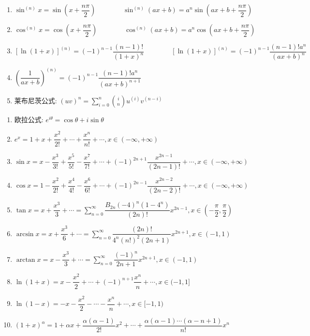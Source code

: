 \begin{theorem}[高阶导数]
	\begin{enumerate}
		\item $\sin^{(n)} x = \sin (x+\dfrac{n\pi}{2})\qquad \qquad\sin^{(n)}(ax+b) = a^{n} \sin(ax+b+\dfrac{n\pi}{2})$
		\item $\cos^{(n)} x = \cos (x+\dfrac{n\pi}{2})\qquad\qquad \cos^{(n)}(ax+b) = a^{n} \cos(ax+b+\dfrac{n\pi}{2})$
		\item $[\ln(1+x)]^{(n)} = (-1)^{n-1}\dfrac{(n-1)!}{(1+x)^{n}}\qquad\qquad [\ln(1+x)]^{(n)} = (-1)^{n-1}\dfrac{(n-1)!a^{n}}{(ax+b)^{n}}$
		\item $(\dfrac{1}{ax+b})^{(n)} = (-1)^{n-1}\dfrac{(n-1)!a^{n}}{(ax+b)^{n+1}}$
		\item 莱布尼茨公式: $(uv)^{n} = \sum\limits_{i=0}^{n}\binom{i}{n}u^{(i)}v^{(n-i)}$

	\end{enumerate}
\end{theorem}

\begin{theorem}[泰勒公式]
	\begin{enumerate}
		\item 欧拉公式: $e^{i\theta}=\cos \theta+i\sin\theta$
		\item $e^{x}=1+x+\dfrac{x^{2}}{2!}+\cdots+\dfrac{x^{n}}{n!}+\cdots, x\in(-\infty,+\infty)$
		\item $\sin x = x-\dfrac{x^{3}}{3!}+\dfrac{x^{5}}{5!}-\dfrac{x^{7}}{7!}+\cdots+(-1)^{2n+1}\dfrac{x^{2n-1}}{(2n-1)!}+\cdots, x\in(-\infty,+\infty)$
		\item $\cos x=1-\dfrac{x^{2}}{2!}+\dfrac{x^{4}}{4!}-\dfrac{x^{6}}{6!}+\cdots+(-1)^{2n-1}\dfrac{x^{2n-2}}{(2n-2)!}+\cdots, x\in(-\infty,+\infty)$
		\item $\tan x = x+\dfrac{x^{3}}{3}+\cdots=\sum\limits_{n=0}^{\infty}\dfrac{B_{2n}(-4)^{n}(1-4^{n})}{(2n)!}x^{2n-1}, x\in(-\dfrac{\pi}{2},\dfrac{\pi}{2})$
		\item $\arcsin x = x+\dfrac{x^{3}}{6}+\cdots=\sum\limits_{n=0}^{\infty}\dfrac{(2n)!}{4^{n}(n!)^{2}(2n+1)}x^{2n+1}, x\in(-1,1)$
		\item $\arctan x = x-\dfrac{x^{3}}{3}+\cdots = \sum\limits_{n=0}^{\infty}\dfrac{(-1)^{n}}{2n+1}x^{2n+1}, x\in(-1,1)$
		\item $\ln (1+x) = x-\dfrac{x^{2}}{2}+\cdots+(-1)^{n+1}\dfrac{x^{n}}{n}+\cdots, x\in(-1,1]$
		\item $\ln (1-x) =-x-\dfrac{x^{2}}{2}-\cdots-\dfrac{x^{n}}{n}+\cdots, x\in[-1,1)$
		\item $(1+x)^{\alpha} = 1+\alpha x+\dfrac{\alpha(\alpha-1)}{2!}x^{2}+\cdots+\dfrac{\alpha(\alpha-1)\cdots(\alpha-n+1)}{n!}x^{n}$
	\end{enumerate}
\end{theorem}

